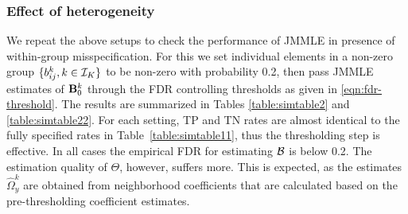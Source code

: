 \subsubsection{Effect of heterogeneity}
We repeat the above setups to check the performance of JMMLE in presence of within-group misspecification. For this we set individual elements in a non-zero group $\{ b_{ij}^k, k \in {\cal{I}}_K \}$ to be non-zero with probability 0.2, then pass JMMLE estimates of ${\mathbf{B}}_0^k$ through the FDR controlling thresholds as given in \eqref{eqn:fdr-threshold}. The results are summarized in Tables \ref{table:simtable2} and \ref{table:simtable22}. For each setting, TP and TN rates are almost identical to the fully specified rates in Table~\ref{table:simtable11}, thus the thresholding step is effective. In all cases the empirical FDR for estimating ${\cal{B}}$ is below 0.2. The estimation quality of $\Theta$, however, suffers more. This is expected, as the estimates $\widehat \Omega_y^k$ are obtained from neighborhood coefficients that are calculated based on the pre-thresholding coefficient estimates.
